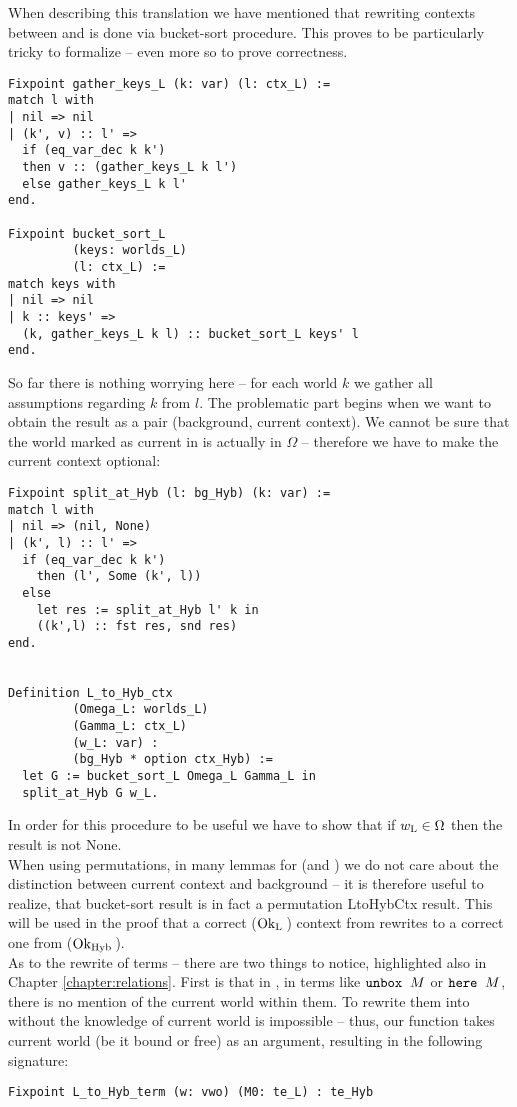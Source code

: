 When describing this translation we have mentioned that rewriting contexts between \langL{} and \langHyb{} is done via bucket-sort procedure. This proves to be particularly tricky to formalize -- even more so to prove correctness.
\begin{verbatim}
Fixpoint gather_keys_L (k: var) (l: ctx_L) :=
match l with
| nil => nil
| (k', v) :: l' =>
  if (eq_var_dec k k')
  then v :: (gather_keys_L k l')
  else gather_keys_L k l'
end.

Fixpoint bucket_sort_L
         (keys: worlds_L)
         (l: ctx_L) :=
match keys with
| nil => nil
| k :: keys' =>
  (k, gather_keys_L k l) :: bucket_sort_L keys' l
end.
\end{verbatim}
So far there is nothing worrying here -- for each world $k$ we gather all assumptions regarding $k$ from $l$. The problematic part begins when we want to obtain  the result as a pair (background, current context). We cannot be sure that the world marked as current in \langL{} is actually in $\Omega$ -- therefore we have to make the current context optional:
\begin{verbatim}
Fixpoint split_at_Hyb (l: bg_Hyb) (k: var) :=
match l with
| nil => (nil, None)
| (k', l) :: l' =>
  if (eq_var_dec k k')
    then (l', Some (k', l))
  else 
    let res := split_at_Hyb l' k in
    ((k',l) :: fst res, snd res)
end.


Definition L_to_Hyb_ctx
         (Omega_L: worlds_L)
         (Gamma_L: ctx_L)
         (w_L: var) :
         (bg_Hyb * option ctx_Hyb) :=
  let G := bucket_sort_L Omega_L Gamma_L in
  split_at_Hyb G w_L.
\end{verbatim}
In order for this procedure to be useful we have to show that if $w_{\tL} \in \Omega$ then the result is not None.\\

When using permutations, in many lemmas for \langHyb{} (and \langLF{}) we do not care about the distinction between current context and background -- it is therefore useful to realize, that bucket-sort result is in fact a permutation LtoHybCtx result. This will be used in the proof that a correct ($\oke[\tL]{}$) context from \langL{} rewrites to a correct one from \langHyb{} ($\oke[\tHyb]{}$).\\

As to the rewrite of terms -- there are two things to notice, highlighted also in Chapter \ref{chapter:relations}. First is that in \langL{}, in terms like $\unbox{M}$ or $\here{M}$, there is no mention of the current world within them. To rewrite them into \langHyb{} without the knowledge of current world is impossible -- thus, our function takes current world (be it bound or free) as an argument, resulting in the following signature:
\begin{verbatim}
Fixpoint L_to_Hyb_term (w: vwo) (M0: te_L) : te_Hyb
\end{verbatim}


